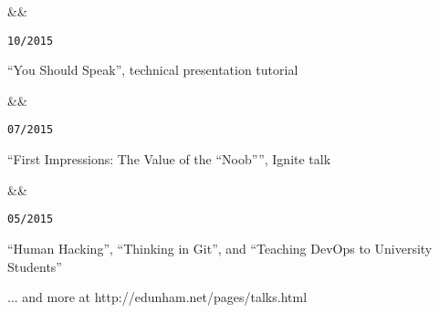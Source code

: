 \documentclass[11pt]{article}
\newcommand{\squish}{
    \setlength{\itemsep}{0.5pt}
    \setlength{\parskip}{0pt}
    \setlength{\parsep}{0.5pt}
}
\newcommand{\when}[1]{
    \hfill \texttt{#1}
}
\newcommand{\experience}[3]{
    \ifx&#2&
        \item[{#1}]
    \else
        \item[{#1}, \emph{#2}]
    \fi
    \when{#3}
}
\begin{document}
\begin{description}
\squish

\experience{SeaGL}
           {}
           {10/2015}

    ``You Should Speak'', technical presentation tutorial

\experience{O'Reilly OSCON}
           {}
           {07/2015}

    ``First Impressions: The Value of the ``Noob'''', Ignite talk

\experience{OpenWest}
           {}
           {05/2015}

    ``Human Hacking'', ``Thinking in Git'', and ``Teaching DevOps to
    University Students''

%

%

%

%

%

%

\hfill ... and more at http://edunham.net/pages/talks.html

\end{description}
\end{document}
